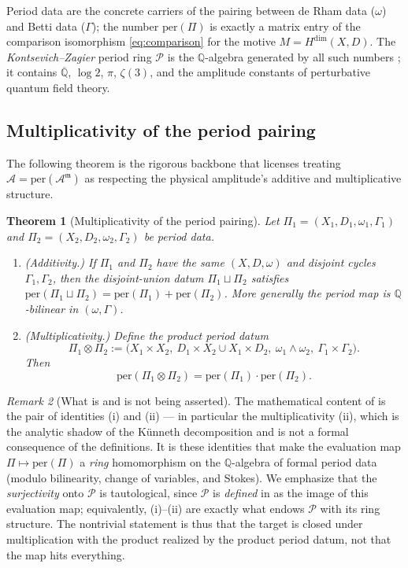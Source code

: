 \documentclass[12pt]{article}
\newtheorem{theorem}{Theorem}[section]
\theoremstyle{definition}
\theoremstyle{remark}
\newtheorem{remark}[theorem]{Remark}
\newcommand{\per}{\mathrm{per}}
\newcommand{\Am}{\mathcal{A}}
\newcommand{\Amm}{\mathcal{A}^{\mathfrak{m}}}
\newcommand{\Qbb}{\mathbb{Q}}
\newcommand{\ol}[1]{\overline{#1}}
\begin{document}
Period data are the concrete carriers of the pairing between de Rham data ($\omega$) and
Betti data ($\Gamma$); the number $\per(\Pi)$ is exactly a matrix entry of the comparison
isomorphism \eqref{eq:comparison} for the motive $M=H^{\dim}(X,D)$. The
\emph{Kontsevich--Zagier} period ring $\mathcal{P}$ is the $\Qbb$-algebra generated by all
such numbers \cite{KontsevichZagier}; it contains $\ol{\Qbb}$, $\log 2$, $\pi$, $\zeta(3)$,
and the amplitude constants of perturbative quantum field theory.

\subsection{Multiplicativity of the period pairing}

The following theorem is the rigorous backbone that licenses treating $\Am=\per(\Amm)$ as
respecting the physical amplitude's additive and multiplicative structure.

\begin{theorem}[Multiplicativity of the period pairing]
\label{thm:period-mult}
Let $\Pi_1=(X_1,D_1,\omega_1,\Gamma_1)$ and $\Pi_2=(X_2,D_2,\omega_2,\Gamma_2)$ be period
data.
\begin{enumerate}[label=\textup{(\roman*)}, leftmargin=2.2em]
\item \textup{(Additivity.)} If $\Pi_1$ and $\Pi_2$ have the same $(X,D,\omega)$ and disjoint
cycles $\Gamma_1,\Gamma_2$, then the disjoint-union datum $\Pi_1\sqcup\Pi_2$ satisfies
$\per(\Pi_1\sqcup\Pi_2)=\per(\Pi_1)+\per(\Pi_2)$. More generally the period map is
$\Qbb$-bilinear in $(\omega,\Gamma)$.
\item \textup{(Multiplicativity.)} Define the \emph{product period datum}
\[
\Pi_1\otimes\Pi_2 := \big(X_1\times X_2,\ D_1\times X_2 \cup X_1\times D_2,\
\omega_1\wedge\omega_2,\ \Gamma_1\times\Gamma_2\big).
\]
Then
\[
\per(\Pi_1\otimes\Pi_2)=\per(\Pi_1)\cdot\per(\Pi_2).
\]
\end{enumerate}
\end{theorem}

\begin{remark}[What is and is not being asserted]
\label{rem:not-tautology}
The mathematical content of  is the pair of identities \textup{(i)} and
\textup{(ii)} --- in particular the multiplicativity \textup{(ii)}, which is the analytic
shadow of the K\"unneth decomposition and is not a formal consequence of the definitions. It
is these identities that make the evaluation map $\Pi\mapsto\per(\Pi)$ a \emph{ring}
homomorphism on the $\Qbb$-algebra of formal period data (modulo bilinearity, change of
variables, and Stokes). We emphasize that the \emph{surjectivity} onto $\mathcal{P}$ is
tautological, since $\mathcal{P}$ is \emph{defined} in \Cref{sec:periods} as the image of this
evaluation map; equivalently, \textup{(i)}--\textup{(ii)} are exactly what endows
$\mathcal{P}$ with its ring structure. The nontrivial statement is thus that the target is
closed under multiplication with the product realized by the product period datum, not that
the map hits everything.
\end{remark}
\end{document}
